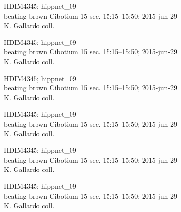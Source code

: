 \documentclass[2pt]{extarticle}
\begin{document}
\noindent
\parbox{0.16\textwidth}{\tiny \raggedright \rule[-0.3\baselineskip]{0pt}{10pt}HDIM4345; hippnet\_09\\ beating brown Cibotium 15 sec. 15:15--15:50; 2015-jun-29\\ K. Gallardo coll.}
\parbox{0.16\textwidth}{\tiny \raggedright \rule[-0.3\baselineskip]{0pt}{10pt}HDIM4345; hippnet\_09\\ beating brown Cibotium 15 sec. 15:15--15:50; 2015-jun-29\\ K. Gallardo coll.}
\parbox{0.16\textwidth}{\tiny \raggedright \rule[-0.3\baselineskip]{0pt}{10pt}HDIM4345; hippnet\_09\\ beating brown Cibotium 15 sec. 15:15--15:50; 2015-jun-29\\ K. Gallardo coll.}
\parbox{0.16\textwidth}{\tiny \raggedright \rule[-0.3\baselineskip]{0pt}{10pt}HDIM4345; hippnet\_09\\ beating brown Cibotium 15 sec. 15:15--15:50; 2015-jun-29\\ K. Gallardo coll.}
\parbox{0.16\textwidth}{\tiny \raggedright \rule[-0.3\baselineskip]{0pt}{10pt}HDIM4345; hippnet\_09\\ beating brown Cibotium 15 sec. 15:15--15:50; 2015-jun-29\\ K. Gallardo coll.}
\parbox{0.16\textwidth}{\tiny \raggedright \rule[-0.3\baselineskip]{0pt}{10pt}HDIM4345; hippnet\_09\\ beating brown Cibotium 15 sec. 15:15--15:50; 2015-jun-29\\ K. Gallardo coll.} \\ 
\vspace{0.001in} 
\end{document}
